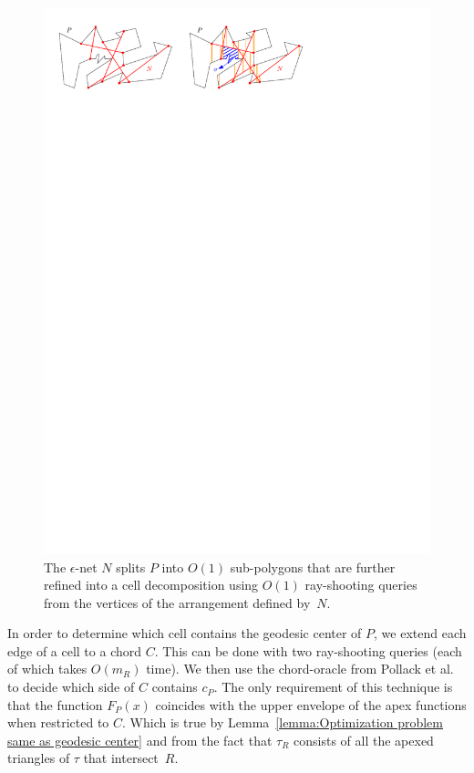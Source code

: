 \documentclass[a4paper,UKenglish]{lipics}
\newcommand{\F}[2]{\ensuremath{F_{\scriptscriptstyle #1}(#2)}}
\newcommand{\cp}{\ensuremath{c_P}}
\newcommand{\m}{\ensuremath{m_{\scriptscriptstyle R}}}
\begin{document}
\begin{figure}[tb]
\centering
\includegraphics{img/CuttingOfChords.pdf}

\caption{\small The $\epsilon$-net $N$ splits $P$ into $O(1)$ sub-polygons that are further refined into a cell decomposition using $O(1)$ ray-shooting queries from the vertices of the arrangement defined by~$N$.}
\label{fig:Cutting of Chords}
\end{figure}

In order to determine which cell contains the geodesic center of $P$, 
we extend each edge of a cell to a chord $C$. 
This can be done with two ray-shooting queries (each of which takes $O(\m)$ time). 
We then use the chord-oracle from Pollack et al.~\cite[Section~3]{pollackComputingCenter} to decide which side of $C$ contains $\cp$.
The only requirement of this technique is that the function $\F{P}{x}$ coincides with the upper envelope of the apex functions when restricted to $C$.
Which is true by Lemma~\ref{lemma:Optimization problem same as geodesic center} and from the fact that $\tau_R$ consists of all the apexed triangles of $\tau$ that intersect~$R$.
\end{document}
